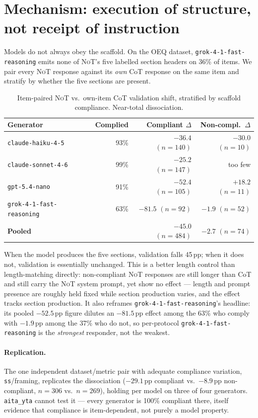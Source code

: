 \documentclass[11pt]{article}
\newcommand{\nano}{\texttt{gpt-5.4-nano}}
\newcommand{\haiku}{\texttt{claude-haiku-4-5}}
\newcommand{\sonnet}{\texttt{claude-sonnet-4-6}}
\newcommand{\grok}{\texttt{grok-4-1-fast-reasoning}}
\newcommand{\NoT}{\textsc{NoT}}
\newcommand{\aitayta}{\texttt{aita\_yta}}
\newcommand{\corrected}[1]{\textcolor{ncottealdk}{\textbf{#1}}}
\begin{document}
\section{Mechanism: execution of structure, not receipt of instruction}
\label{sec:mechanism}

Models do not always obey the scaffold. On the OEQ dataset, \grok{} emits none
of \NoT{}'s five labelled section headers on 36\% of items. We pair every \NoT{}
response against its \emph{own} CoT response on the same item and stratify by
whether the five sections are present.

\begin{table}[t]
\centering
\small
\begin{tabular}{lrrr}
\toprule
Generator & Complied & Compliant $\Delta$ & Non-compl.\ $\Delta$ \\
\midrule
\haiku{}  & 93\% & $-36.4$ $(n{=}140)$ & $-30.0$ $(n{=}10)$ \\
\sonnet{} & 99\% & $-25.2$ $(n{=}147)$ & too few \\
\nano{}   & 91\% & $-52.4$ $(n{=}105)$ & $+18.2$ $(n{=}11)$ \\
\grok{}   & 63\% & $\mathbf{-81.5}$ $(n{=}92)$ & $-1.9$ $(n{=}52)$ \\
\midrule
\textbf{Pooled} & & \corrected{$\mathbf{-45.0}$ $(n{=}484)$} & $\mathbf{-2.7}$ $(n{=}74)$ \\
\bottomrule
\end{tabular}
\caption{Item-paired \NoT{} vs.\ own-item CoT validation shift, stratified by
scaffold compliance. Near-total dissociation.}
\label{tab:compliance}
\end{table}

When the model produces the five sections, validation falls 45\,pp; when it does
not, validation is essentially unchanged. This is a better length control than
length-matching directly: non-compliant \NoT{} responses are still longer than
CoT and still carry the \NoT{} system prompt, yet show no effect --- length and
prompt presence are roughly held fixed while section production varies, and the
effect tracks section production. It also reframes \grok{}'s headline: its
pooled $-52.5$\,pp figure dilutes an $-81.5$\,pp effect among the 63\% who
comply with $-1.9$\,pp among the 37\% who do not, so per-protocol \grok{} is the
\emph{strongest} responder, not the weakest.

\paragraph{Replication.} The one independent dataset/metric pair with adequate
compliance variation, \texttt{ss}/framing, replicates the dissociation
($-29.1$\,pp compliant vs.\ $-8.9$\,pp non-compliant, $n{=}306$ vs.\ $n{=}269$),
holding per model on three of four generators. \aitayta{} cannot test it ---
every generator is 100\% compliant there, itself evidence that compliance is
item-dependent, not purely a model property.
\end{document}
